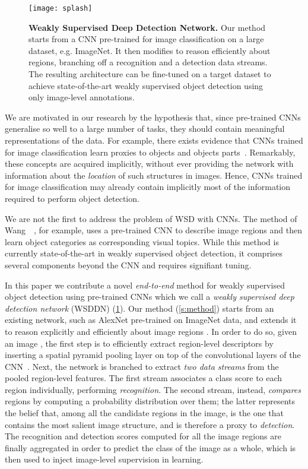 \documentclass[10pt,twocolumn,letterpaper]{article}
\begin{document}
\begin{figure}
\begin{center}
\texttt{[image: splash]} 
\end{center}
\caption{{\bf Weakly Supervised Deep Detection Network.} Our method starts from a CNN pre-trained for image classification on a large dataset, e.g. ImageNet. It then modifies to reason efficiently about regions, branching off a recognition and a detection data streams. The resulting architecture can be fine-tuned on a target dataset to achieve state-of-the-art weakly supervised object detection using only image-level annotations.}
\label{f:splash}
\end{figure}

We are motivated in our research by the hypothesis that, since pre-trained CNNs generalise so well to a large number of tasks, they should contain meaningful representations of the data. For example, there exists evidence that CNNs trained for image classification learn proxies to objects and objects parts~\cite{Zhou15}. Remarkably, these concepts are acquired implicitly, without ever providing the network with information about the \emph{location} of such structures in images. Hence, CNNs trained for image classification may already contain implicitly most of the information required to perform object detection.

We are not the first to address the problem of WSD with CNNs. The method of Wang~\etal~\cite{Wang14a}, for example, uses a pre-trained CNN to describe image regions and then learn object categories as corresponding visual topics. While this method is currently state-of-the-art in weakly supervised object detection, it comprises several components beyond the CNN and requires signifiant tuning. 

In this paper we contribute a novel {\em end-to-end} method for weakly supervised object detection using pre-trained CNNs which we call a \emph{weakly supervised deep detection network} (WSDDN) (\cref{f:splash}). Our method (\cref{s:method}) starts from an existing network, such as AlexNet pre-trained on ImageNet data, and extends it to reason explicitly and efficiently about image regions . In order to do so, given an image , the first step is to efficiently extract region-level descriptors  by inserting a spatial pyramid pooling layer on top of the convolutional layers of the CNN~\cite{He14,Girshick15}. Next,  the network is branched to extract \emph{two data streams} from the pooled region-level features. The first stream associates a class score  to each region individually, performing \emph{recognition}.  The second stream, instead, \emph{compares} regions by computing a probability distribution  over them; the latter represents the belief that, among all the candidate regions in the image,   is the one that contains the most salient image structure, and is therefore a proxy to \emph{detection}. The recognition and detection scores computed for all the image regions are finally aggregated in order to predict the class of the image as a whole, which is then used to inject image-level supervision in learning.
\end{document}
